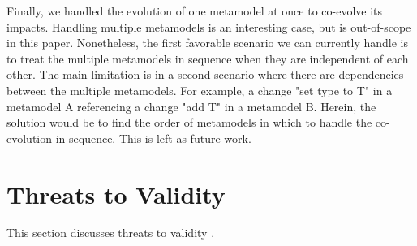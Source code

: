 	Finally, we handled the evolution of one metamodel at once to co-evolve its impacts. Handling multiple metamodels is an interesting case, but is out-of-scope in this paper. Nonetheless, the first favorable scenario we can currently handle is to treat the multiple metamodels in sequence when they are independent of each other. The main limitation is in a second scenario where there are dependencies between the multiple metamodels. For example, a change "set type to T" in a metamodel A referencing a change "add T" in a metamodel B. Herein, the solution would be to find the order of metamodels in which to handle the co-evolution in sequence. This is left as future work. 
	
	\section{Threats to Validity}\label{threat}
	\noindent This section discusses threats to validity \cite{wohlin2012experimentation}.
	

